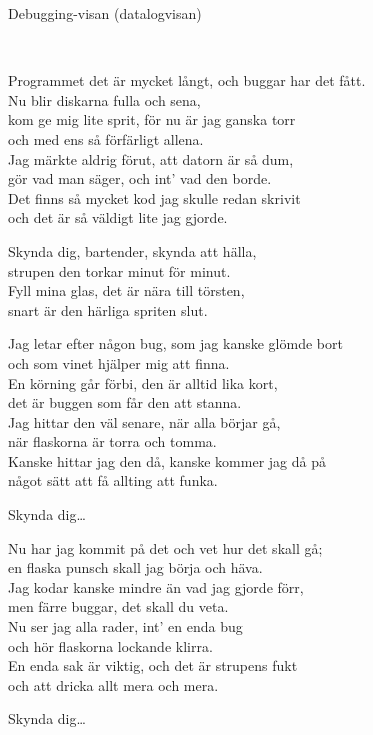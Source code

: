 \begin{song}{Debugging-visan (datalogvisan)}

	
	
	\\

	\showversenumber	
	Programmet det är mycket långt, och buggar har det fått.\\
	Nu blir diskarna fulla och sena,\\
	kom ge mig lite sprit, för nu är jag ganska torr\\
	och med ens så förfärligt allena.\\
	Jag märkte aldrig förut, att datorn är så dum,\\
	gör vad man säger, och int' vad den borde.\\
	Det finns så mycket kod jag skulle redan skrivit\\
	och det är så väldigt lite jag gjorde.
	
	
	Skynda dig, bartender, skynda att hälla,\\
	strupen den torkar minut för minut.\\
	Fyll mina glas, det är nära till törsten,\\
	snart är den härliga spriten slut.
	
	\newpage
	
	\showversenumber
	Jag letar efter någon bug, som jag kanske glömde bort\\
	och som vinet hjälper mig att finna.\\
	En körning går förbi, den är alltid lika kort,\\
	det är buggen som får den att stanna.\\
	Jag hittar den väl senare, när alla börjar gå,\\
	när flaskorna är torra och tomma.\\
	Kanske hittar jag den då, kanske kommer jag då på\\
	något sätt att få allting att funka.
	
	Skynda dig\ldots
	
	\showversenumber
	Nu har jag kommit på det och vet hur det skall gå;\\
	en flaska punsch skall jag börja och häva.\\
	Jag kodar kanske mindre än vad jag gjorde förr,\\
	men färre buggar, det skall du veta.\\
	Nu ser jag alla rader, int' en enda bug\\
	och hör flaskorna lockande klirra.\\
	En enda sak är viktig, och det är strupens fukt\\
	och att dricka allt mera och mera.
	
	Skynda dig\ldots
	
\end{song}

